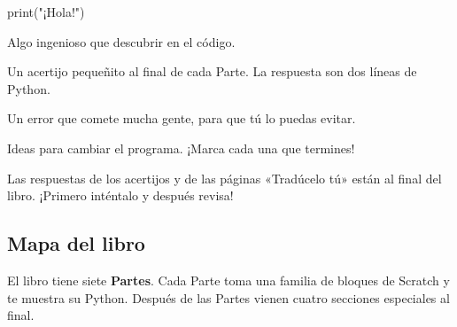 \noindent
\begin{minipage}[t]{0.485\linewidth}\vspace{0pt}
\begin{typethis}
print("¡Hola!")
\end{typethis}
\begin{think}
Algo ingenioso que descubrir en el código.
\end{think}
\begin{puzzle}
Un acertijo pequeñito al final de cada Parte. La respuesta son dos líneas de Python.
\end{puzzle}
\end{minipage}\hfill
\begin{minipage}[t]{0.485\linewidth}\vspace{0pt}
\begin{watchout}
Un error que comete mucha gente, para que tú lo puedas evitar.
\end{watchout}
\begin{challenge}
Ideas para cambiar el programa. ¡Marca cada una que termines!
\end{challenge}
\end{minipage}

Las respuestas de los acertijos y de las páginas «Tradúcelo tú» están al final del libro. ¡Primero inténtalo y después revisa!

\subsection*{Mapa del libro}

El libro tiene siete \textbf{Partes}. Cada Parte toma una familia de bloques de Scratch y te muestra su Python. Después de las Partes vienen cuatro secciones especiales al final.

